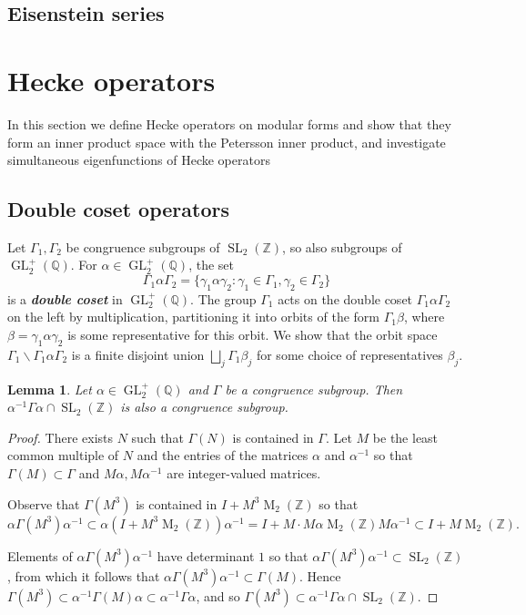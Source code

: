 \documentclass[10pt,leqno,twoside]{article}
\theoremstyle{plain}
\newtheorem{lemma}[lem]{Lemma}
\theoremstyle{definition}
\numberwithin{equation}{section}
\numberwithin{lem}{section}
\newcommand{\textib}[1]{\textbf{\textit{#1\index{#1}}}} %
\DeclareMathOperator{\Mat}{M}
\DeclareMathOperator{\GL}{GL}
\DeclareMathOperator{\SL}{SL}
\newcommand{\slz}{\SL_2(\mathbb{Z})}
\newcommand{\glqp}{\GL_2^+(\mathbb{Q})}
\newcommand{\tbd}{{\Huge\color{red}{\textib{TBD}}}}
\begin{document}
\subsection{Eisenstein series}

\newpage\section{Hecke operators}
In this section we define Hecke operators on modular forms and show that they form an inner product space with the Petersson inner product, and investigate simultaneous eigenfunctions of Hecke operators \tbd
\subsection{Double coset operators}
Let $\varGamma_1,\varGamma_2$ be congruence subgroups of $\slz$, so also subgroups of $\glqp$. For $\alpha\in\glqp$, the set
\[\varGamma_1\alpha\varGamma_2 = \{\gamma_1\alpha\gamma_2 : \gamma_1\in\varGamma_1, \gamma_2\in\varGamma_2\}\] is a \textib{double coset} in $\glqp$. The group $\varGamma_1$ acts on the double coset $\varGamma_1\alpha\varGamma_2$ on the left by multiplication, partitioning it into orbits of the form $\varGamma_1\beta$, where $\beta = \gamma_1\alpha\gamma_2$ is some representative for this orbit. We show that the orbit space  $\varGamma_1\backslash\varGamma_1\alpha\varGamma_2$ is a finite disjoint union $\bigsqcup_j\varGamma_1\beta_j$ for some choice of representatives $\beta_j$.
\begin{lemma}\label{lem: conjugation congruence subgroup}
    Let $\alpha\in\glqp$ and $\varGamma$ be a congruence subgroup. Then $\alpha^{-1}\varGamma\alpha\cap\slz$ is also a congruence subgroup.
\end{lemma}
\begin{proof}
    There exists $N$ such that $\varGamma(N)$ is contained in $\varGamma$. Let $M$ be the least common multiple of $N$ and the entries of the matrices $\alpha$ and $\alpha^{-1}$ so that $\varGamma(M)\subset \varGamma$ and $M\alpha, M\alpha^{-1}$ are integer-valued matrices.
    
    Observe that $\varGamma(M^3)$ is contained in $I + M^3\Mat_2(\mathbb Z)$ so that 
    \[\alpha\varGamma(M^3)\alpha^{-1}\subset \alpha(I + M^3\Mat_2(\mathbb Z))\alpha^{-1} = I + M\cdot M\alpha \Mat_2(\mathbb Z) M\alpha^{-1}\subset I+M\Mat_2(\mathbb{Z}).\]
    
    Elements of $\alpha\varGamma(M^3)\alpha^{-1}$ have determinant $1$ so that $\alpha\varGamma(M^3)\alpha^{-1}\subset \slz$, from which it follows that $\alpha\varGamma(M^3)\alpha^{-1}\subset \varGamma(M)$. Hence $\varGamma(M^3)\subset \alpha^{-1}\varGamma(M)\alpha \subset \alpha^{-1}\varGamma\alpha$, and so $\varGamma(M^3)\subset \alpha^{-1}\varGamma\alpha\cap \slz$.
\end{proof}
\end{document}
